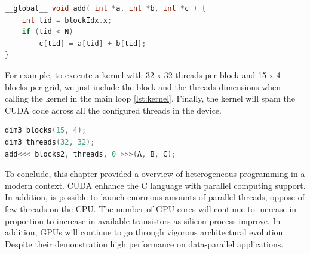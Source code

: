 \begin{lstlisting}[language=C++, label={lst:gpu}, caption={GPU Kernel threads launch}]
__global__ void add( int *a, int *b, int *c ) {
	int tid = blockIdx.x;
	if (tid < N)
		c[tid] = a[tid] + b[tid];
}
\end{lstlisting}

For example, to execute a kernel with 32 x 32 threads per block and 15 x 4 blocks per grid, we just include the block and the threads dimensions when calling the kernel in the main loop \ref{lst:kernel}. Finally, the kernel will spam the CUDA code across all the configured threads in the device.

\begin{lstlisting}[language=C++, label={lst:kernel}, caption={Kernel call with configurable threads per block and block per grid}]
dim3 blocks(15, 4);
dim3 threads(32, 32);
add<<< blocks2, threads, 0 >>>(A, B, C);
\end{lstlisting}


\vspace{3.2em}


To conclude, this chapter provided a overview of heterogeneous programming in a modern context. CUDA enhance the C language with parallel computing support. In addition, is possible to launch enormous amounts of parallel threads, oppose of few threads on the CPU. The number of GPU cores will continue to increase in proportion to increase in available transistors as silicon process improve. In addition, GPUs will continue to go through vigorous architectural evolution. Despite their demonstration high performance on data-parallel applications.







